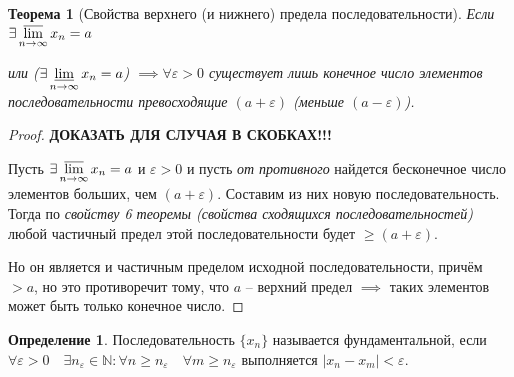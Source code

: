 \documentclass[a4paper,oneside]{article}
\newtheorem{theorem}{Теорема}[subsection]
\theoremstyle{definition}
\newtheorem{definition}{Определение}[subsection]
\theoremstyle{definition}
\theoremstyle{definition}
\begin{document}
\begin{theorem}[Свойства верхнего (и нижнего) предела последовательности]
    Если $\exists \displaystyle\varlimsup_{n \to \infty} x_n = a$ 

    или ($\exists \displaystyle\varliminf_{n \to \infty} x_n = a$)
    $\implies \forall \varepsilon > 0$ существует лишь конечное число элементов
    последовательности превосходящие $(a + \varepsilon)$ (меньше $(a - \varepsilon)$).
\end{theorem}
\begin{proof}
    \textbf{ДОКАЗАТЬ ДЛЯ СЛУЧАЯ В СКОБКАХ!!!}

    Пусть $\exists \displaystyle\varlimsup_{n \to \infty} x_n = a$ и $\varepsilon > 0$ и
    пусть \textit{от противного} найдется бесконечное число элементов больших, чем
    $(a + \varepsilon)$. Составим из них новую последовательность. Тогда по 
    \textit{свойству 6 теоремы (свойства сходящихся последовательностей)} любой
    частичный предел этой последовательности будет $\ge (a + \varepsilon)$.
    
    Но он является и частичным пределом исходной последовательности, причём $> a$, но
    это противоречит тому, что $a$ -- верхний предел $\implies$ таких элементов может
    быть только конечное число.
\end{proof}

\begin{definition}
    Последовательность $\{x_n\}$ называется фундаментальной, если 
    $\forall \varepsilon > 0 \quad \exists n_\varepsilon \in \mathbb{N}:
    \forall n \ge n_\varepsilon \quad \forall m \ge n_\varepsilon$
    выполняется $|x_n - x_m| < \varepsilon$.
\end{definition}
\end{document}
